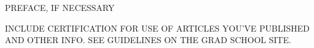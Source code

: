 
PREFACE, IF NECESSARY

INCLUDE CERTIFICATION FOR USE OF ARTICLES YOU'VE PUBLISHED AND OTHER INFO.
SEE GUIDELINES ON THE GRAD SCHOOL SITE.

